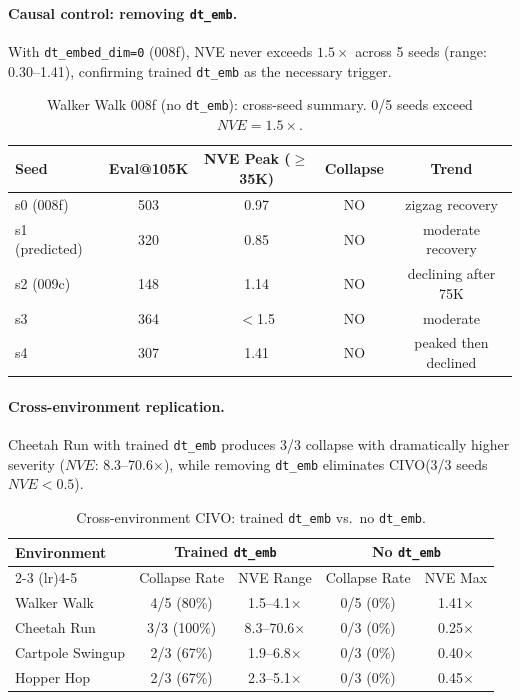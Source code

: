 \documentclass[letterpaper]{article}
\newcommand{\civo}{CIVO\xspace}
\newcommand{\nve}{NVE\xspace}
\newcommand{\dtemb}{\texttt{dt\_emb}\xspace}
\begin{document}
\paragraph{Causal control: removing \dtemb.}
With \texttt{dt\_embed\_dim=0} (008f), \nve never exceeds $1.5\times$ across 5 seeds (range: 0.30--1.41), confirming trained \dtemb as the necessary trigger.

\begin{table}[h]
\centering
\caption{Walker Walk 008f (no \dtemb): cross-seed summary. 0/5 seeds exceed $\nve = 1.5\times$.}
\label{tab:008f_seeds}
\begin{tabular}{lcccc}
\toprule
Seed & Eval@105K & NVE Peak ($\geq$35K) & Collapse & Trend \\
\midrule
s0 (008f) & 503 & 0.97 & NO & zigzag recovery \\
s1 (predicted) & 320 & 0.85 & NO & moderate recovery \\
s2 (009c) & 148 & 1.14 & NO & declining after 75K \\
s3 & 364 & $<$1.5 & NO & moderate \\
s4 & 307 & 1.41 & NO & peaked then declined \\
\bottomrule
\end{tabular}
\end{table}

\paragraph{Cross-environment replication.}
Cheetah Run with trained \dtemb produces 3/3 collapse with dramatically higher severity ($\nve$: 8.3--70.6$\times$), while removing \dtemb eliminates \civo (3/3 seeds $\nve < 0.5$).

\begin{table}[h]
\centering
\caption{Cross-environment \civo: trained \dtemb vs.\ no \dtemb.}
\label{tab:cross_env_civo}
\begin{tabular}{lcccc}
\toprule
Environment & \multicolumn{2}{c}{Trained \dtemb} & \multicolumn{2}{c}{No \dtemb} \\
\cmidrule(lr){2-3} \cmidrule(lr){4-5}
 & Collapse Rate & NVE Range & Collapse Rate & NVE Max \\
\midrule
Walker Walk & 4/5 (80\%) & 1.5--4.1$\times$ & 0/5 (0\%) & 1.41$\times$ \\
Cheetah Run & 3/3 (100\%) & 8.3--70.6$\times$ & 0/3 (0\%) & 0.25$\times$ \\
Cartpole Swingup & 2/3 (67\%) & 1.9--6.8$\times$ & 0/3 (0\%) & 0.40$\times$ \\
Hopper Hop & 2/3 (67\%) & 2.3--5.1$\times$ & 0/3 (0\%) & 0.45$\times$ \\
\bottomrule
\end{tabular}
\end{table}
\end{document}
